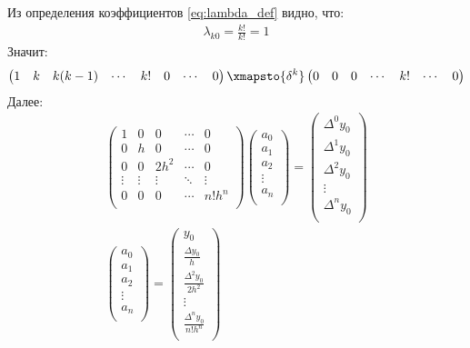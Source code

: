 Из определения коэффициентов \cref{eq:lambda_def} видно, что:
\begin{align}
	\lambda_{k0} = \frac{k!}{k!} = 1
\end{align}
Значит:
\begin{align}
	\begin{pmatrix}
		1 & k & k(k-1) & \cdots & k! & 0 & \cdots & 0
	\end{pmatrix} \xmapsto{\delta^k}
	\begin{pmatrix}
		0 & 0 & 0 & \cdots & k! & \cdots & 0
	\end{pmatrix}
\end{align}
Далее:
\begin{align}
	\begin{pmatrix}
		1      & 0      & 0      & \cdots & 0      \\
		0      & h      & 0      & \cdots & 0      \\
		0      & 0      & 2 h^2  & \cdots & 0      \\
		\vdots & \vdots & \vdots & \ddots & \vdots \\
		0      & 0      & 0      & \cdots & n! h^n \\
	\end{pmatrix}
	\begin{pmatrix}
		a_0    \\
		a_1    \\
		a_2    \\
		\vdots \\
		a_n    \\
	\end{pmatrix} =
	\begin{pmatrix}
		\Delta^0 y_0 \\
		\Delta^1 y_0 \\
		\Delta^2 y_0 \\
		\vdots       \\
		\Delta^n y_0 \\
	\end{pmatrix} \\
	\begin{pmatrix}
		a_0    \\
		a_1    \\
		a_2    \\
		\vdots \\
		a_n    \\
	\end{pmatrix} =
	\begin{pmatrix}
		y_0                        \\
		\frac{\Delta y_0}{h}       \\
		\frac{\Delta^2 y_0}{2h^2}  \\
		\vdots                     \\
		\frac{\Delta^n y_0}{n!h^n} \\
	\end{pmatrix}
\end{align}
